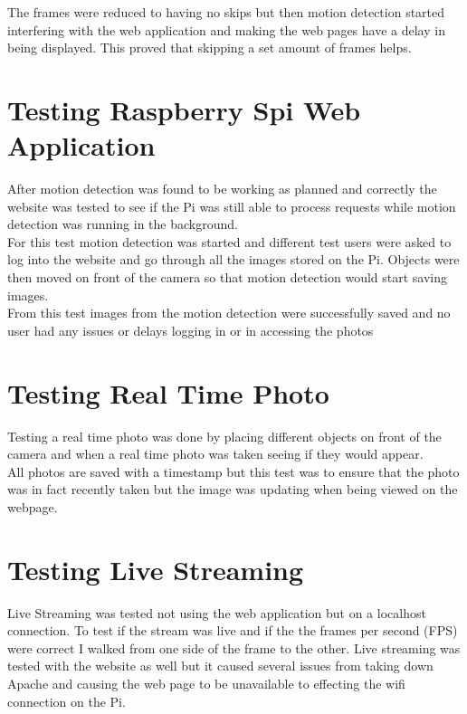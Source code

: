 \documentclass[]{report}
\begin{document}
The frames were reduced to having no skips but then motion detection started interfering with the web application and making the web pages have a delay in being displayed. This proved that skipping a set amount of frames helps.\\

\section{Testing Raspberry Spi Web Application}
\label{sec:websiteTest}
%
After motion detection was found to be working as planned and correctly the website was tested to see if the Pi was still able to process requests while motion detection was running in the background.\\

For this test motion detection was started and different test users were asked to log into the website and go through all the images stored on the Pi. Objects were then moved on front of the camera so that motion detection would start saving images.\\ 

From this test images from the motion detection were successfully saved and no user had any issues or delays logging in or in accessing the photos\\


\section{Testing Real Time Photo}
\label{sec:realPhotoTest}
%

Testing a real time photo was done by placing different objects on front of the camera and when a real time photo was taken seeing if they would appear. \\

All photos are saved with a timestamp but this test was to ensure that the photo was in fact recently taken but the image was updating when being viewed on the webpage.\\


\section{Testing Live Streaming}
\label{sec:liveStreamTest}
%
Live Streaming was tested not using the web application but on a localhost connection. To test if the stream was live and if the the frames per second (FPS) were correct I walked from one side of the frame to the other. 
Live streaming was tested with the website as well but it caused several issues from taking down Apache and causing the web page to be unavailable to effecting the wifi connection on the Pi.
\end{document}
